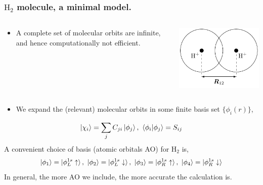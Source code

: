 \documentclass{beamer}
\renewcommand{\(}{\left(}
\renewcommand{\)}{\right)}
\renewcommand{\[}{\left[}
\renewcommand{\]}{\right]}
\begin{document}
\begin{frame}
    \frametitle{$\text{H}_2$ molecule, a minimal model.}
    \begin{columns}
        \begin{column}[]{0.7\textwidth}
        \begin{itemize}
            \item A complete set of molecular orbits are infinite, and hence computationally not efficient.
        \end{itemize} 
        \end{column}
        \begin{column}[]{0.3\textwidth}
            \begin{center}
                \includegraphics[scale=0.7]{h2_ilust.pdf}
            \end{center}
        \end{column}
    \end{columns}
    \vspace{5pt}
    \begin{itemize}
        \item We expand the (relevant) molecular orbits in some finite basis set $\{\phi_i(r)\}$, 
    \end{itemize}
    \begin{align*}
        \ket{\chi_i} = \sum_j C_{ji} \ket{\phi_j}, \ \braket{\phi_i|\phi_j} = S_{ij}
    \end{align*}
    \pause
    A convenient choice of basis (atomic orbitals AO) for $\text{H}_2$ is, 
    \begin{align*}
        \ket{\phi_1} = \ket{\phi^{1s}_{L} \uparrow}, \ \ket{\phi_2} = \ket{\phi^{1s}_{L} \downarrow}, \ \ket{\phi_3} = \ket{\phi^{1s}_{R} \uparrow}, \ \ket{\phi_4} = \ket{\phi^{1s}_{R} \downarrow}
    \end{align*}
    In general,  the more AO we include, the more accurate the calculation is. 
\end{frame}
\end{document}
